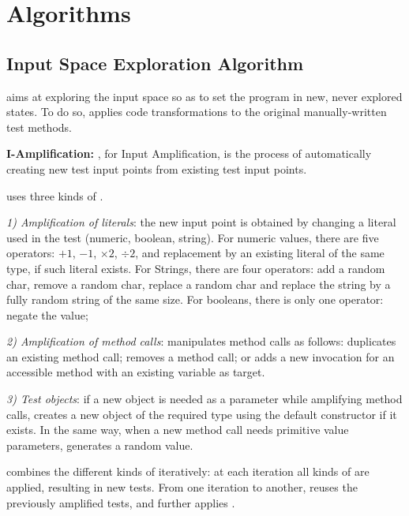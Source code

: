 \section{Algorithms}

\subsection{Input Space Exploration Algorithm}
\label{subsec:input-space-exploration}

\dspot aims at exploring the input space so as to set the program in new, never explored states. To do so, \dspot applies code transformations to the original manually-written test methods. 

\textbf{I-Amplification:} \Iampl, for Input Amplification, is the process of automatically creating new test input points from existing test input points.

\dspot uses three kinds of \Iampl.

\emph{1) Amplification of literals}: the new input point is obtained by changing a literal used in the test (numeric, boolean, string).
For numeric values, there are five operators: $+1$, $-1$, $\times 2$, $ \div 2$, and replacement by an existing literal of the same type, if such literal exists.
For Strings, there are four operators: add a random char, remove a random char, replace a random char and replace the string by a fully random string of the same size.
For booleans, there is only one operator: negate the value;

\emph{2) Amplification of method calls}: \dspot manipulates method calls as follows:
\dspot duplicates an existing method call; removes a method call;
or adds a new invocation for an accessible method with an existing variable as target.

\emph{3) Test objects}:
if a new object is needed as a parameter while amplifying method calls, \dspot creates a new object of the required type using the default constructor if it exists.
In the same way, when a new method call needs primitive value parameters, \dspot generates a random value.

\dspot combines the different kinds of \Iampl iteratively: at each iteration all kinds of \Iampl are applied, resulting in new tests. 
From one iteration to another, \dspot reuses the previously amplified tests, and further applies \Iampl{}.

